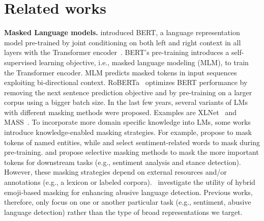 \vspace{-3pt}
\section{Related works}\label{sec:related_work}
\vspace{-3pt}
\textbf{Masked Language models.} 
\citet{devlin-2019-bert} introduced BERT, a language representation model pre-trained by joint conditioning on both left and right context in all layers with the Transformer encoder~\cite{vaswani2017attention}. BERT's pre-training introduces a self-supervised learning objective, i.e., masked language modeling (MLM), to train the Transformer encoder. MLM predicts masked tokens in input sequences exploiting bi-directional context. %
RoBERTa~\cite{liu2019roberta} optimizes BERT performance by removing the next sentence prediction objective and by pre-training on a larger corpus using a bigger batch size. In the last few years, several variants of LMs with different masking methods were proposed. Examples are XLNet~\cite{yang2019xlnet} and MASS~\cite{song2019mass}. %
To incorporate more domain specific knowledge into LMs, some works introduce knowledge-enabled masking strategies. For example, \citet{sun2019ernie,zhang-2019-ernie,lin-2021-entitybert} propose to mask tokens of named entities, while %
\citet{tian-2020-skep} and \citet{ke-2020-sentilare} select sentiment-related words to mask during pre-training. \citet{gu-2020-train} and \citet{kawintiranon-2021-knowledge} propose selective masking methods to mask the more important tokens for downstream tasks (e.g., sentiment analysis and stance detection). However, these masking strategies depend on external resources and/or annotations (e.g., a lexicon or labeled corpora).~\citet{corazza-2020-hybrid} investigate the utility of hybrid emoji-based masking for enhancing abusive language detection. Previous works, therefore, only focus on one or another particular task (e.g., sentiment, abusive language detection) rather than the type of broad representations we target.

